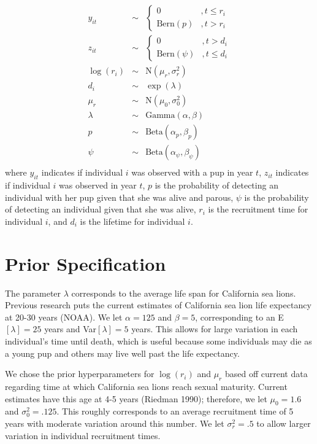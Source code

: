 \documentclass[12pt, a4paper]{article}
\begin{document}
\begin{eqnarray*}
y_{it} & \sim & \begin{cases} 0 & , t \leq r_i \\
\text{Bern}(p) & , t > r_i \end{cases} \\
z_{it} & \sim & \begin{cases} 0 & , t > d_i \\
\text{Bern}(\psi) & , t \leq d_i \end{cases} \\
\log(r_i) & \sim & \text{N}(\mu_r, \sigma_r^2) \\
d_i & \sim & \exp(\lambda) \\
\mu_r & \sim & \text{N}(\mu_0, \sigma_0^2) \\
\lambda & \sim & \text{Gamma}(\alpha, \beta) \\
p & \sim & \text{Beta}(\alpha_p, \beta_p) \\
\psi & \sim & \text{Beta}(\alpha_{\psi}, \beta_{\psi} )\\
\end{eqnarray*}
where $y_{it}$ indicates if individual $i$ was observed with a pup in year $t$, $z_{it}$ indicates if individual $i$ was observed in year $t$, $p$ is the probability of detecting an individual with her pup given that she was alive and parous, $\psi$ is the probability of detecting an individual given that she was alive, $r_i$ is the recruitment time for individual $i$, and $d_i$ is the lifetime for individual $i$. 

\section{Prior Specification}
The parameter $\lambda$ corresponds to the average life span for California sea lions. Previous research puts the current estimates of California sea lion life expectancy at 20-30 years (NOAA). We let $\alpha = 125$ and $\beta = 5$, corresponding to an E$[\lambda] = 25$ years and Var$[\lambda] = 5$ years. This allows for large variation in each individual's time until death, which is useful because some individuals may die as a young pup and others may live well past the life expectancy. 

We chose the prior hyperparameters for $\log(r_i)$ and $\mu_r$ based off current data regarding time at which California sea lions reach sexual maturity. Current estimates have this age at 4-5 years (Riedman 1990); therefore, we let $\mu_0 = 1.6$ and $\sigma_0^2 = .125$. This roughly corresponds to an average recruitment time of 5 years with moderate variation around this number. We let $\sigma_r^2 = .5$ to allow larger variation in individual recruitment times. 
\end{document}
